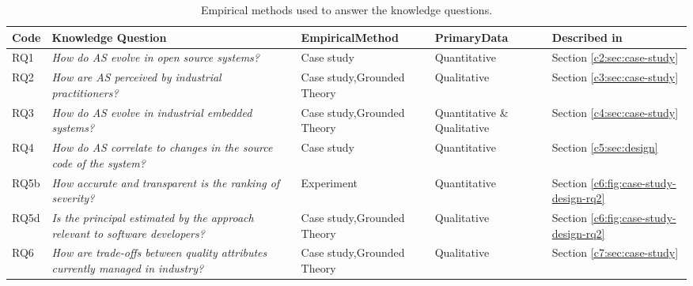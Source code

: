 \begin{table}[]
    \footnotesize
    \centering
    \caption{Empirical methods used to answer the knowledge questions.}
    \label{c1:tab:overview-methodology}
    \begin{tabular}{@{}lm{3.75cm}m{2.75cm}m{2cm}l@{}}
    \toprule
    \textbf{Code} & \textbf{Knowledge Question} & \textbf{Empirical}\newline \textbf{Method} & \textbf{Primary}\newline \textbf{Data} & \textbf{Described in} \\ \midrule
    RQ1 & \textit{How do AS evolve in open source systems?} & Case study & Quantitative & Section \ref{c2:sec:case-study} \\
    RQ2 & \textit{How are AS perceived by industrial practitioners?} & Case study,\newline Grounded Theory & Qualitative & Section \ref{c3:sec:case-study}  \\
    RQ3 & \textit{How do AS evolve in industrial embedded systems?} & Case study,\newline Grounded Theory & Quantitative \& Qualitative & Section \ref{c4:sec:case-study} \\
    RQ4 & \textit{How do AS correlate to changes in the source code of the system?} & Case study & Quantitative  & Section \ref{c5:sec:design} \\
    RQ5b & \textit{How accurate and transparent is the ranking of severity?} & Experiment & Quantitative & Section \ref{c6:fig:case-study-design-rq2}  \\ 
    RQ5d & \textit{Is the principal estimated by the approach relevant to software developers?} & Case study,\newline Grounded Theory & Qualitative & Section \ref{c6:fig:case-study-design-rq2}  \\ 
    RQ6 & \textit{How are trade-offs between quality attributes currently managed in industry?} & Case study,\newline Grounded Theory & Qualitative & Section \ref{c7:sec:case-study} \\ \bottomrule
    \end{tabular}
\end{table}

